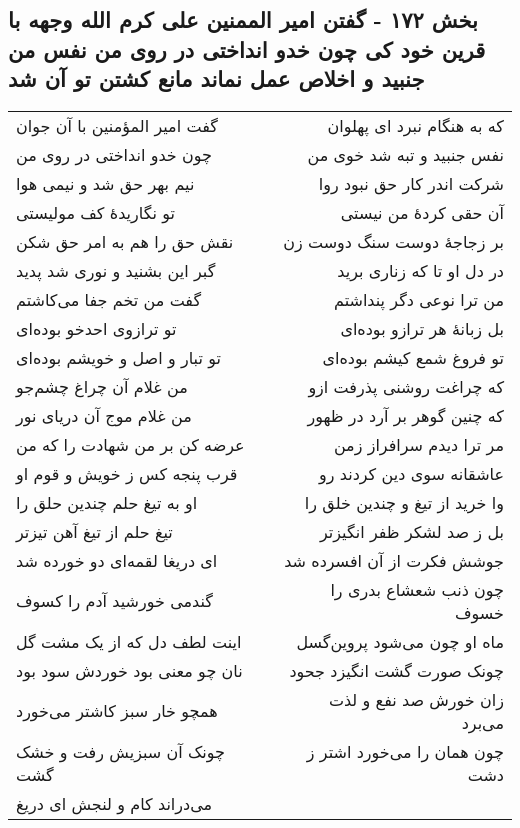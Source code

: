 \begin{center}
\section*{بخش ۱۷۲ - گفتن امیر الممنین علی کرم الله وجهه با قرین خود کی چون خدو انداختی در روی من نفس من جنبید و اخلاص عمل نماند مانع کشتن تو آن شد}
\label{sec:sh172}
\begin{longtable}{l p{0.5cm} r}
گفت امیر المؤمنین با آن جوان
&&
که به هنگام نبرد ای پهلوان
\\
چون خدو انداختی در روی من
&&
نفس جنبید و تبه شد خوی من
\\
نیم بهر حق شد و نیمی هوا
&&
شرکت اندر کار حق نبود روا
\\
تو نگاریدهٔ کف مولیستی
&&
آن حقی کردهٔ من نیستی
\\
نقش حق را هم به امر حق شکن
&&
بر زجاجهٔ دوست سنگ دوست زن
\\
گبر این بشنید و نوری شد پدید
&&
در دل او تا که زناری برید
\\
گفت من تخم جفا می‌کاشتم
&&
من ترا نوعی دگر پنداشتم
\\
تو ترازوی احدخو بوده‌ای
&&
بل زبانهٔ هر ترازو بوده‌ای
\\
تو تبار و اصل و خویشم بوده‌ای
&&
تو فروغ شمع کیشم بوده‌ای
\\
من غلام آن چراغ چشم‌جو
&&
که چراغت روشنی پذرفت ازو
\\
من غلام موج آن دریای نور
&&
که چنین گوهر بر آرد در ظهور
\\
عرضه کن بر من شهادت را که من
&&
مر ترا دیدم سرافراز زمن
\\
قرب پنجه کس ز خویش و قوم او
&&
عاشقانه سوی دین کردند رو
\\
او به تیغ حلم چندین حلق را
&&
وا خرید از تیغ و چندین خلق را
\\
تیغ حلم از تیغ آهن تیزتر
&&
بل ز صد لشکر ظفر انگیزتر
\\
ای دریغا لقمه‌ای دو خورده شد
&&
جوشش فکرت از آن افسرده شد
\\
گندمی خورشید آدم را کسوف
&&
چون ذنب شعشاع بدری را خسوف
\\
اینت لطف دل که از یک مشت گل
&&
ماه او چون می‌شود پروین‌گسل
\\
نان چو معنی بود خوردش سود بود
&&
چونک صورت گشت انگیزد جحود
\\
همچو خار سبز کاشتر می‌خورد
&&
زان خورش صد نفع و لذت می‌برد
\\
چونک آن سبزیش رفت و خشک گشت
&&
چون همان را می‌خورد اشتر ز دشت
\\
می‌دراند کام و لنجش ای دریغ

\end{longtable}
\end{center}
